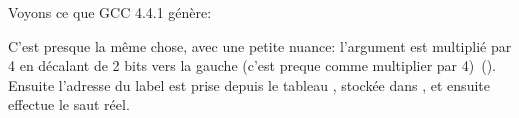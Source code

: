 

\label{switch_lot_GCC}

Voyons ce que GCC 4.4.1 génère:




C'est presque la même chose, avec une petite nuance: l'argument  est multiplié
par 4 en décalant de 2 bits vers la gauche (c'est preque comme multiplier par 4)~().
Ensuite l'adresse du label est prise depuis le tableau , stockée
dans \EAX, et ensuite  effectue le saut réel.

